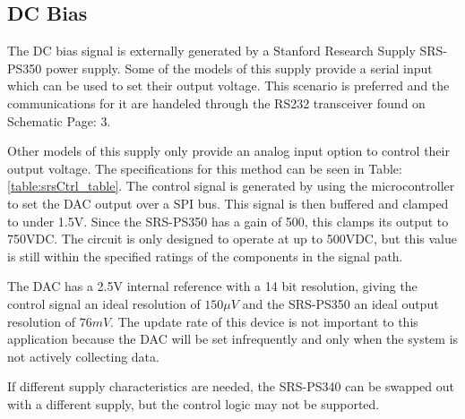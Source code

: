 \subsection {DC Bias}
\label{sec:dcBias}

The DC bias signal is externally generated by a Stanford Research Supply SRS-PS350 power supply. Some of the models of this supply provide a serial input which can be used to set their output voltage. This scenario is preferred and the communications for it are handeled through the RS232 transceiver found on Schematic Page: 3.



Other models of this supply only provide an analog input option to control their output voltage. The specifications for this method can be seen in Table: \ref{table:srsCtrl_table}. The control signal is generated by using the microcontroller to set the DAC output over a SPI bus. This signal is then buffered and clamped to under 1.5V. Since the SRS-PS350 has a gain of 500, this clamps its output to 750VDC. The circuit is only designed to operate at up to 500VDC, but this value is still within the specified ratings of the components in the signal path.

The DAC has a 2.5V internal reference with a 14 bit resolution, giving the control signal an ideal resolution of $150\mu V$ and the SRS-PS350 an ideal output resolution of $76mV$. The update rate of this device is not important to this application because the DAC will be set infrequently and only when the system is not actively collecting data.

If different supply characteristics are needed, the SRS-PS340 can be swapped out with a different supply, but the control logic may not be supported.

